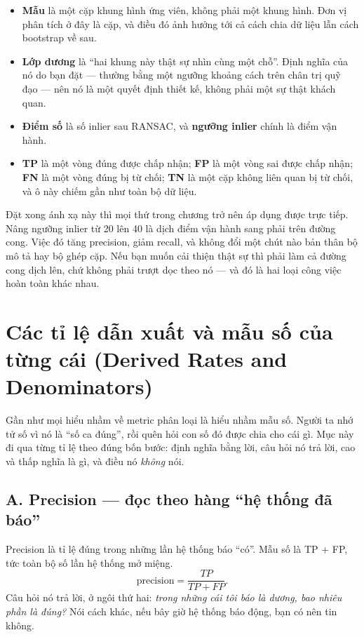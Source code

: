 \documentclass[../../deep_learning.tex]{subfiles}
\begin{document}
\begin{itemize}
\item \textbf{Mẫu} là một cặp khung hình ứng viên, không phải một khung hình. Đơn vị phân tích ở đây là cặp, và điều đó ảnh hưởng tới cả cách chia dữ liệu lẫn cách bootstrap về sau.
\item \textbf{Lớp dương} là ``hai khung này thật sự nhìn cùng một chỗ''. Định nghĩa của nó do bạn đặt --- thường bằng một ngưỡng khoảng cách trên chân trị quỹ đạo --- nên nó là một quyết định thiết kế, không phải một sự thật khách quan.
\item \textbf{Điểm số} là số inlier sau RANSAC, và \textbf{ngưỡng inlier} chính là điểm vận hành.
\item \textbf{TP} là một vòng đúng được chấp nhận; \textbf{FP} là một vòng sai được chấp nhận; \textbf{FN} là một vòng đúng bị từ chối; \textbf{TN} là một cặp không liên quan bị từ chối, và ô này chiếm gần như toàn bộ dữ liệu.
\end{itemize}

Đặt xong ánh xạ này thì mọi thứ trong chương trở nên áp dụng được trực tiếp. Nâng ngưỡng inlier từ 20 lên 40 là dịch điểm vận hành sang phải trên đường cong. Việc đó tăng precision, giảm recall, và không đổi một chút nào bản thân bộ mô tả hay bộ ghép cặp. Nếu bạn muốn cải thiện thật sự thì phải làm cả đường cong dịch lên, chứ không phải trượt dọc theo nó --- và đó là hai loại công việc hoàn toàn khác nhau.

\section{Các tỉ lệ dẫn xuất và mẫu số của từng cái (Derived Rates and Denominators)}
Gần như mọi hiểu nhầm về metric phân loại là hiểu nhầm mẫu số. Người ta nhớ tử số vì nó là ``số ca đúng'', rồi quên hỏi con số đó được chia cho cái gì. Mục này đi qua từng tỉ lệ theo đúng bốn bước: định nghĩa bằng lời, câu hỏi nó trả lời, cao và thấp nghĩa là gì, và điều nó \emph{không} nói.

\subsection{A. Precision --- đọc theo hàng ``hệ thống đã báo''}
Precision là tỉ lệ đúng trong những lần hệ thống báo ``có''. Mẫu số là TP + FP, tức toàn bộ số lần hệ thống mở miệng.
\[
\text{precision} = \frac{TP}{TP+FP}.
\]
Câu hỏi nó trả lời, ở ngôi thứ hai: \emph{trong những cái tôi báo là dương, bao nhiêu phần là đúng?} Nói cách khác, nếu bây giờ hệ thống báo động, bạn có nên tin không.
\end{document}
